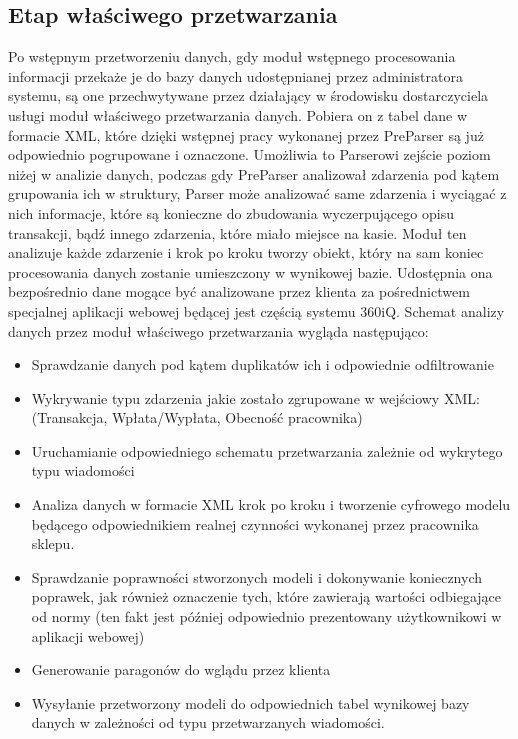 \documentclass[a4paper]{book}
\begin{document}
\subsection{Etap właściwego przetwarzania}
Po wstępnym przetworzeniu danych, gdy moduł wstępnego procesowania informacji przekaże je do bazy danych udostępnianej przez administratora systemu, są one przechwytywane przez działający w środowisku dostarczyciela usługi moduł właściwego przetwarzania danych. Pobiera on z tabel dane w formacie XML, które dzięki wstępnej pracy wykonanej przez PreParser są już odpowiednio pogrupowane i oznaczone. Umożliwia to Parserowi zejście poziom niżej w analizie danych, podczas gdy PreParser analizował zdarzenia pod kątem grupowania ich w struktury, Parser może analizować same zdarzenia i wyciągać z nich informacje, które są konieczne do zbudowania wyczerpującego opisu transakcji, bądź innego zdarzenia, które miało miejsce na kasie.
Moduł ten analizuje każde zdarzenie i krok po kroku tworzy obiekt, który na sam koniec procesowania danych zostanie umieszczony w wynikowej bazie. Udostępnia ona bezpośrednio dane mogące być analizowane przez klienta za pośrednictwem specjalnej aplikacji webowej będącej jest częścią systemu 360iQ. Schemat analizy danych przez moduł właściwego przetwarzania wygląda następująco:
\begin{itemize}
\item Sprawdzanie danych pod kątem duplikatów ich i odpowiednie odfiltrowanie
\item Wykrywanie typu zdarzenia jakie zostało zgrupowane w wejściowy XML: (Transakcja, Wpłata/Wypłata, Obecność pracownika)
\item Uruchamianie odpowiedniego schematu przetwarzania zależnie od wykrytego typu wiadomości
\item Analiza danych w formacie XML krok po kroku i tworzenie cyfrowego modelu będącego odpowiednikiem realnej czynności wykonanej przez pracownika sklepu.
\item Sprawdzanie poprawności stworzonych modeli i dokonywanie koniecznych poprawek, jak również oznaczenie tych, które zawierają wartości odbiegające od normy (ten fakt jest później odpowiednio prezentowany użytkownikowi w aplikacji webowej)
\item Generowanie paragonów do wglądu przez klienta
\item Wysyłanie przetworzony modeli do odpowiednich tabel wynikowej bazy danych w zależności od typu przetwarzanych wiadomości.
\end{itemize}
\end{document}
